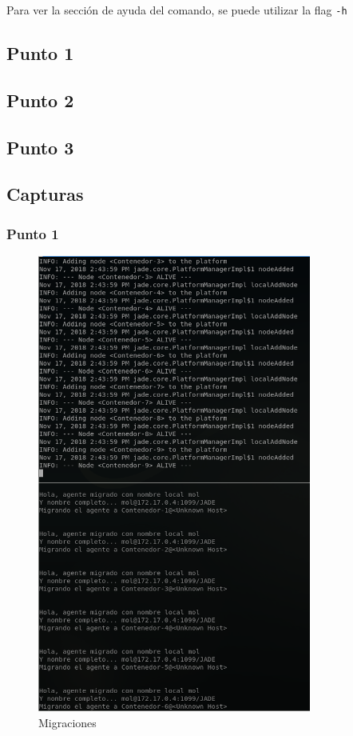 \documentclass[12pt,journal,compsoc]{IEEEtran}
\begin{document}
Para ver la sección de ayuda del comando, se puede utilizar la flag \texttt{-h}

\newpage
\onecolumn
{}
\label{appendix:codigo-java}

\subsection{Punto 1}
\label{section:code-punto1}


\subsection{Punto 2}
\label{section:code-punto2}


\subsection{Punto 3}
\label{section:code-punto3}


\newpage
\subsection{Capturas}
\subsubsection{Punto 1}
\label{section:cap-punto1}
\begin{figure}[H]
  \centering
  \label{fig:punto-1-migracion}
  \includegraphics[width=90mm]{images/punto-1/1-migraciones.png}
  \caption{Migraciones}
\end{figure}
\end{document}
